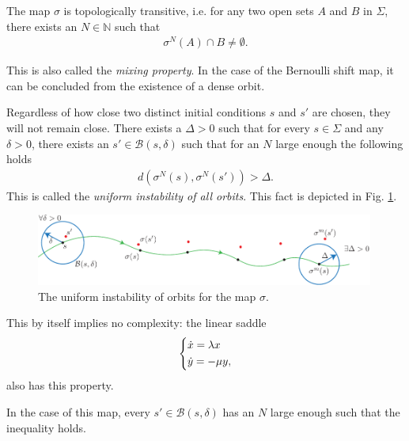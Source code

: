 \begin{proposition}[]
	The map $\sigma$ is topologically transitive, i.e. for any two open sets $A$ and $B$ in $\Sigma$, there exists an $N \in \mathbb{N}$ such that
	\begin{align}
		\sigma^{N}(A) \cap B \neq \emptyset.
	\end{align}
\end{proposition}
	This is also called the \emph{mixing property}. In the case of the Bernoulli shift map, it can be concluded from the existence of a dense orbit.
\begin{proposition}
	Regardless of how close two distinct initial conditions $s$ and $s'$ are chosen, they will not remain close. There exists a $\Delta>0$ such that for every $s\in\Sigma$ and any $\delta>0$, there exists an $s' \in \mathcal{B}\left(s, \delta\right)$ such that for an $N$ large enough the following holds
	\begin{align}
		d(\sigma^{N}(s), \sigma^{N}(s') ) > \Delta.
	\end{align}
	This is called the \emph{uniform instability of all orbits}. This fact is depicted in Fig. \ref{fig:unif_instab}.	
\end{proposition}

\begin{figure}[h!]
	\centering
	\includegraphics[width=0.99\textwidth]{figures/ch6/22unif_instab.pdf}
	\caption{The uniform instability of orbits for the map $\sigma$.}
	\label{fig:unif_instab}
\end{figure}

\begin{remark}[]
	This by itself implies no complexity: the linear saddle
	\begin{align}
		\begin{dcases}
			\dot{x} = \lambda x \\
			\dot{y} = - \mu y,
		\end{dcases}
	\end{align}
also has this property.	
\end{remark}

\begin{remark}[]
	In the case of this map, every $s'\in \mathcal{B}\left(s, \delta \right)$ has an $N$ large enough such that the inequality holds.
\end{remark}

